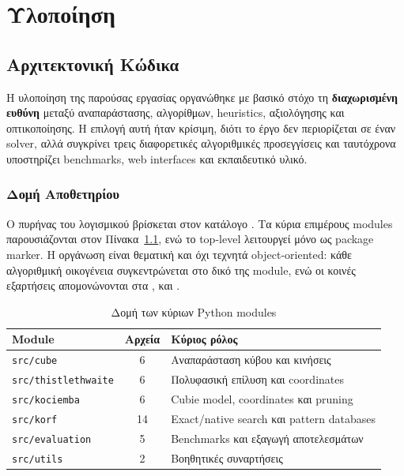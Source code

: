 \chapter{Υλοποίηση}
\label{ch:implementation}

\section{Αρχιτεκτονική Κώδικα}

Η υλοποίηση της παρούσας εργασίας οργανώθηκε με βασικό στόχο τη \textbf{διαχωρισμένη ευθύνη} μεταξύ αναπαράστασης, αλγορίθμων, heuristics, αξιολόγησης και οπτικοποίησης. Η επιλογή αυτή ήταν κρίσιμη, διότι το έργο δεν περιορίζεται σε έναν solver, αλλά συγκρίνει τρεις διαφορετικές αλγοριθμικές προσεγγίσεις και ταυτόχρονα υποστηρίζει benchmarks, web interfaces και εκπαιδευτικό υλικό.

\subsection{Δομή Αποθετηρίου}

Ο πυρήνας του λογισμικού βρίσκεται στον κατάλογο . Τα κύρια επιμέρους modules παρουσιάζονται στον Πίνακα~\ref{tab:impl_modules}, ενώ το top-level  λειτουργεί μόνο ως package marker. Η οργάνωση είναι θεματική και όχι τεχνητά object-oriented: κάθε αλγοριθμική οικογένεια συγκεντρώνεται στο δικό της module, ενώ οι κοινές εξαρτήσεις απομονώνονται στα ,  και .

\begin{table}[htbp]
\centering
\caption{Δομή των κύριων Python modules}
\label{tab:impl_modules}
\begin{tabular}{lcl}
\toprule
\textbf{Module} & \textbf{Αρχεία} & \textbf{Κύριος ρόλος} \\
\midrule
\texttt{src/cube} & 6  & Αναπαράσταση κύβου και κινήσεις \\
\texttt{src/thistlethwaite} & 6  & Πολυφασική επίλυση και coordinates \\
\texttt{src/kociemba} & 6  & Cubie model, coordinates και pruning \\
\texttt{src/korf} & 14 & Exact/native search και pattern databases \\
\texttt{src/evaluation} & 5 & Benchmarks και εξαγωγή αποτελεσμάτων \\
\texttt{src/utils} & 2 & Βοηθητικές συναρτήσεις \\
\bottomrule
\end{tabular}
\end{table}

